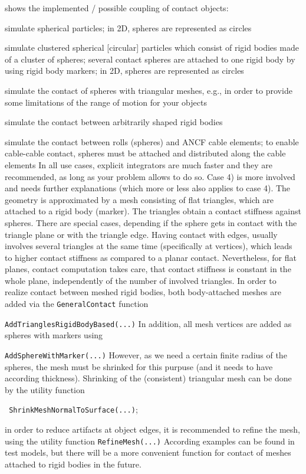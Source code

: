 \noindent {} shows the implemented / possible coupling of contact objects:
\bi
  \item[1)] simulate spherical particles; in 2D, spheres are represented as circles
  \item[2)] simulate clustered spherical [circular] particles which consist of rigid bodies made of a cluster of spheres; several contact spheres are attached to one rigid body by using rigid body markers; in 2D, spheres are represented as circles
  \item[3)] simulate the contact of spheres with triangular meshes, e.g., in order to provide some limitations of the range of motion for your objects
  \item[4)] simulate the contact between arbitrarily shaped rigid bodies
  \item[5)] simulate the contact between rolls (spheres) and ANCF cable elements; to enable cable-cable contact, spheres must be attached and distributed along the cable elements
\ei
In all use cases, explicit integrators are much faster and they are recommended, as long as your problem allows to do so.
%
Case 4) is more involved and needs further explanations (which more or less also applies to case 4). The geometry is approximated by a mesh consisting of flat triangles, which are attached to a rigid body (marker). The triangles obtain a contact stiffness against spheres. There are special cases, depending if the sphere gets in contact with the triangle plane or with the triangle edge. Having contact with edges, usually involves several triangles at the same time (specifically at vertices), which leads to higher contact stiffness as compared to a planar contact. Nevertheless, for flat planes, contact computation takes care, that contact stiffness is constant in the whole plane, independently of the number of involved triangles.
In order to realize contact between meshed rigid bodies, both body-attached meshes are added via the \texttt{GeneralContact} function 
\bi
  \item \texttt{AddTrianglesRigidBodyBased(...)}
\ei
In addition, all mesh vertices are added as spheres with markers using 
\bi
  \item \texttt{AddSphereWithMarker(...)}
\ei
However, as we need a certain finite radius of the spheres, the mesh must be shrinked for this purpuse (and it needs to have according thickness). Shrinking of the (consistent) triangular mesh can be done by the utility function 
\bi
  \item \texttt{ ShrinkMeshNormalToSurface(...)};
  \item in order to reduce artifacts at object edges, it is recommended to refine the mesh, using the utility function \texttt{RefineMesh(...)}
\ei
According examples can be found in test models, but there will be a more convenient function for contact of meshes attached to rigid bodies in the future.

